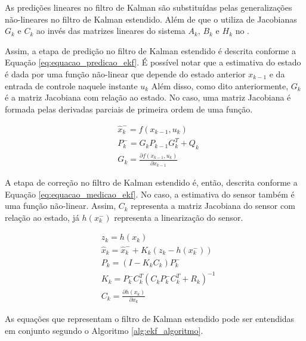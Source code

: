 \documentclass[acronym, symbols, table]{fei}
\begin{document}
			As predições lineares no filtro de Kalman são substituídas pelas generalizações não-lineares no filtro de Kalman estendido. Além de que o  utiliza de Jacobianas $G_k$ e $C_k$ ao invés das matrizes lineares do sistema $A_k$, $B_k$ e $H_k$ no .
			
			Assim, a etapa de predição no filtro de Kalman estendido é descrita conforme a Equação \ref{eq:equacao_predicao_ekf}. É possível notar que a estimativa do estado é dada por uma função não-linear que depende do estado anterior $x_{k-1}$ e da entrada de controle naquele instante $u_{k}$ Além disso, como dito anteriormente, $G_{k}$ é a matriz Jacobiana com relação ao estado. No caso, uma matriz Jacobiana é formada pelas derivadas parciais de primeira ordem de uma função.
			
			\begin{equation} \label{eq:equacao_predicao_ekf}
				\begin{split}
					&\hat{x}_{k}^{-} = f(x_{k-1}, u_{k}) \\
					&P_{k}^{-} = G_{k}P_{k-1}G_{k}^{T} + Q_{k} \\
					&G_{k} = \frac{\partial f(x_{k-1}, u_{k})}{\partial x_{k-1}} 
				\end{split}
			\end{equation}
			
			A etapa de correção no filtro de Kalman estendido é, então, descrita conforme a Equação \ref{eq:equacao_medicao_ekf}. No caso, a estimativa do sensor também é uma função não-linear. Assim, $C_k$ representa a matriz Jacobiana do sensor com relação ao estado, já $h(x_{k}^{-})$ representa a linearização do sensor.
			
			\begin{equation} \label{eq:equacao_medicao_ekf}
				\begin{split}
					&z_k = h(x_{k}) \\
					&\hat{x}_{k} = \hat{x}_{k}^{-} + K_{k}(z_k - h(x_{k}^{-})) \\
					&P_{k} = (I - K_{k}C_{k})P_{k}^{-} \\
					&K_k = P_{k}^{-}C_{k}^T(C_{k}P_{k}^{-}C_{k}^T + R_k)^{-1} \\
					&C_k = \frac{\partial h(x_k)}{\partial x_{k}}
				\end{split}
			\end{equation}
			
			As equações que representam o filtro de Kalman estendido pode ser entendidas em conjunto segundo o Algoritmo \ref{alg:ekf_algoritmo}.
			
\end{document}
